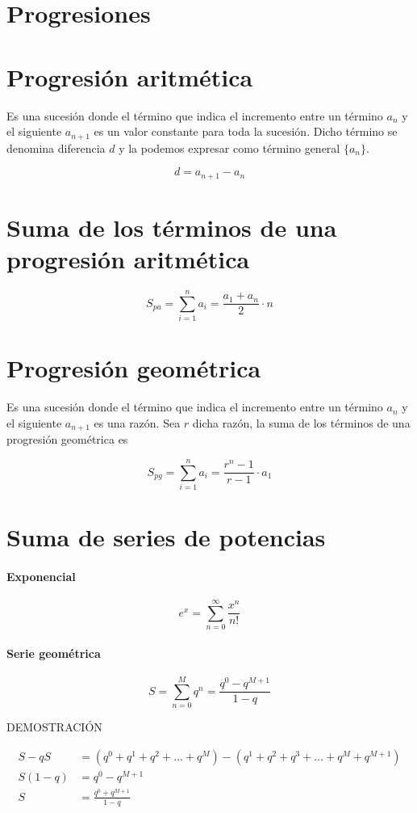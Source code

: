 \section{Progresiones}

\section{Progresión aritmética}
Es una sucesión donde el término que indica el incremento entre un término $a_n$ y el siguiente
$a_{n+1}$ es un valor constante para toda la sucesión. Dicho término se denomina diferencia $d$ y
la podemos expresar como término general $\{a_n\}$.

$$d=a_{n+1}-a_n$$

\section{Suma de los términos de una progresión aritmética}
$$S_{pa}=\sum_{i=1}^n a_i = \frac{a_1+a_n}{2}\cdot n$$

\section{Progresión geométrica}
Es una sucesión donde el término que indica el incremento entre un término $a_n$ y el siguiente
$a_{n+1}$ es una razón. Sea $r$ dicha razón, la suma de los términos de una progresión geométrica es

$$S_{pg}=\sum_{i=1}^na_i=\frac{r^n-1}{ r-1}\cdot a_1$$

\section{Suma de series de potencias}
\paragraph{Exponencial}
$$e^x=\sum_{n=0}^\infty \frac{x^n}{n!}$$

\paragraph{Serie geométrica}
$$S=\sum_{n=0}^M q^n = \frac{q^0-q^{M+1}}{1-q}$$

DEMOSTRACIÓN

\begin{align*}
	S-qS &= (q^0+q^1+q^2+\dotsc+q^M)-(q^1+q^2+q^3+\dotsc+q^{M}+q^{M+1}) \\
	S(1-q) &= q^0-q^{M+1} \\
	S &= \frac{q^0+q^{M+1}}{1-q}
\end{align*}


